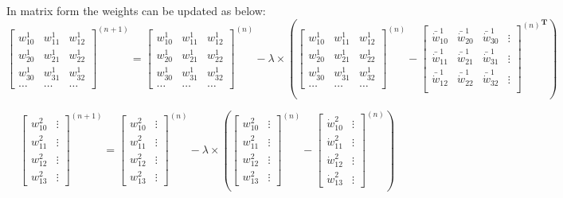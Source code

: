 \documentclass[a4paper,11pt]{article}
\begin{document}
In matrix form the weights can be updated as below:
$$
\left[
\begin{matrix}
	w_{10}^1 & w_{11}^1 & w_{12}^1\\
	w_{20 }^1& w_{21}^1 & w_{22}^1 \\
	w_{30}^1 & w_{31}^1 & w_{32}^1\\
	\hdots & \hdots & \hdots
\end{matrix}
\right]^{(n+1)}
=
\left[
\begin{matrix}
	w_{10}^1 & w_{11}^1 & w_{12}^1\\
	w_{20 }^1& w_{21}^1 & w_{22}^1 \\
	w_{30}^1 & w_{31}^1 & w_{32}^1\\
	\hdots & \hdots & \hdots
\end{matrix}
\right]^{(n)}
-
\lambda \times
\left(
\left[
\begin{matrix}
	w_{10}^1 & w_{11}^1 & w_{12}^1\\
	w_{20 }^1& w_{21}^1 & w_{22}^1 \\
	w_{30}^1 & w_{31}^1 & w_{32}^1\\
	\hdots & \hdots & \hdots
\end{matrix}
\right]^{(n)}
-
{
\left[
\begin{matrix}
	\bar{\dot{w}}_{10}^1& \bar{\dot{w}}_{20}^1& \bar{\dot{w}}_{30}^1 & \vdots\\
	\bar{\dot{w}}_{11}^1 & \bar{\dot{w}}_{21}^1 & \bar{\dot{w}}_{31}^1 & \vdots\\
	\bar{\dot{w}}_{12}^1 & \bar{\dot{w}}_{22}^1 & \bar{\dot{w}}_{32}^1 & \vdots\\
\end{matrix}
\right]^{(n)}}^\textbf{T}
\right)
$$

$$
\left[
\begin{matrix}
	w_{10}^2 &\vdots \\ w_{11}^2 &\vdots \\ w_{12}^2 &\vdots \\ w_{13}^2  & \vdots 
\end{matrix}
\right]^{(n+1)}
 = 
 \left[
 \begin{matrix}
 	w_{10}^2 &\vdots \\ w_{11}^2 &\vdots \\ w_{12}^2 &\vdots \\ w_{13}^2  & \vdots 
 \end{matrix}
 \right]^{(n)}
 -\lambda\times
 \left(
 \left[
 \begin{matrix}
 	w_{10}^2 &\vdots \\ w_{11}^2 &\vdots \\ w_{12}^2 &\vdots \\ w_{13}^2  & \vdots 
 \end{matrix}
 \right]^{{(n)}}
 -
 \left[
 \begin{matrix}
 	\dot{w}_{10}^2 &\vdots \\ \dot{w}_{11}^2 &\vdots \\ \dot{w}_{12}^2 &\vdots \\ \dot{w}_{13}^2  & \vdots
 \end{matrix}
 \right]^{(n)}
 \right)
$$
\end{document}
